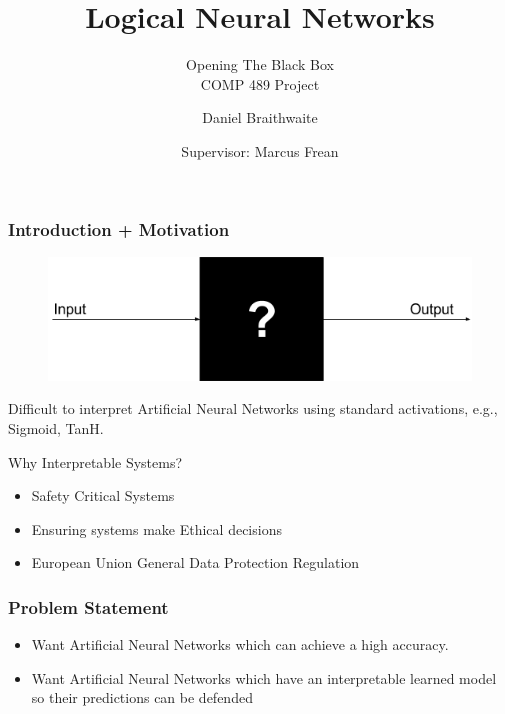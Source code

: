 \documentclass[]{beamer}
\title{Logical Neural Networks}
\subtitle{Opening The Black Box\\
\vspace{0.5cm}
\small COMP 489 Project
}
\author{Daniel Braithwaite}
\date{Supervisor: Marcus Frean}
\begin{document}
\begin{frame}
\titlepage
\end{frame}

\begin{frame}
\frametitle{Introduction + Motivation}

\begin{figure}
\centering
	\begin{minipage}[b]{0.8\textwidth}
		\includegraphics[width=\textwidth]{Images/BlackBox.png}
	\end{minipage}
	\hfill
\end{figure}

 Difficult to interpret Artificial Neural Networks using standard activations, e.g., Sigmoid, TanH.

\begin{block}{Why Interpretable Systems?}
\begin{itemize}
\item Safety Critical Systems
\item Ensuring systems make Ethical decisions
\item European Union General Data Protection Regulation
\end{itemize}
\end{block}
\end{frame}

\begin{frame}
\frametitle{Problem Statement}

\begin{itemize}
\item Want Artificial Neural Networks which can achieve a high accuracy.
\item Want Artificial Neural Networks which have an interpretable learned model so their predictions can be defended
\end{itemize}

\end{frame}
\end{document}
